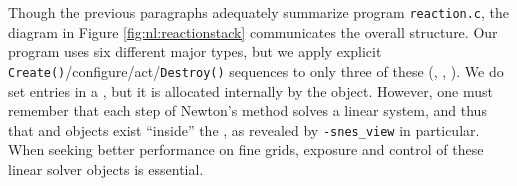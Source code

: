 

Though the previous paragraphs adequately summarize program \texttt{reaction.c}, the diagram in Figure \ref{fig:nl:reactionstack} communicates the overall structure.  Our program uses six different major \PETSc types, but we apply explicit \texttt{Create()}/configure/act/\texttt{Destroy()} sequences to only three of these (\pDMDA, \pSNES, \pVec).  We do set entries in a \pMat, but it is allocated internally by the \pDMDA object.  However, one must remember that each step of Newton's method solves a linear system, and thus that \pKSP and \pPC objects exist ``inside'' the \pSNES, as revealed by \texttt{-snes\_view} in particular.  When seeking better performance on fine grids, exposure and control of these linear solver objects is essential.

